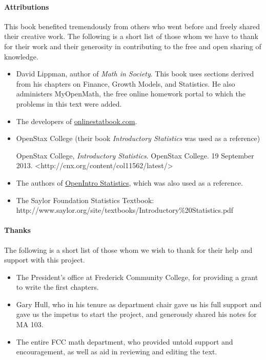 \paragraph{Attributions} This book benefited tremendously from others who went before and freely shared their creative work.  The following is a short list of those whom we have to thank for their work and their generosity in contributing to the free and open sharing of knowledge.
\begin{itemize}
\item David Lippman, author of \textit{Math in Society}.  This book uses sections derived from his chapters on Finance, Growth Models, and Statistics.  He also administers MyOpenMath, the free online homework portal to which the problems in this text were added.
\item The developers of \href{onlinestatbook.com}{onlinestatbook.com}.
\item OpenStax College (their book \textit{Introductory Statistics} was used as a reference)

OpenStax College, \textit{Introductory Statistics}. OpenStax College. 19 September 2013. <http://cnx.org/content/col11562/latest/>
\item The authors of \href{https://www.openintro.org/stat/?stat_book=os}{OpenIntro Statistics}, which was also used as a reference.
\item The Saylor Foundation Statistics Textbook: http://www.saylor.org/site/textbooks/Introductory$\%$20Statistics.pdf
\end{itemize}

\paragraph{Thanks} The following is a short list of those whom we wish to thank for their help and support with this project.
\begin{itemize}
\item The President's office at Frederick Community College, for providing a grant to write the first chapters.
\item Gary Hull, who in his tenure as department chair gave us his full support and gave us the impetus to start the project, and generously shared his notes for MA 103.
\item The entire FCC math department, who provided untold support and encouragement, as well as aid in reviewing and editing the text.
\end{itemize}





















